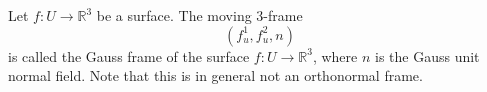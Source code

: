 Let $f: U \to \mathbb{R}^3$ be a surface. The moving 3-frame
$$(f_u^1, f_u^2, n)$$
is called the Gauss frame of the surface $f: U \to \mathbb{R}^3$, where $n$ is the Gauss unit normal field. Note that this is in general not an orthonormal frame.
